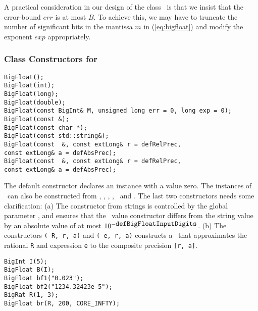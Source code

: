 A practical consideration in our design of the class \BF\ is
that we insist that the error-bound $err$
is at most $B$.  To achieve this, we may
have to truncate the number of significant
bits in the mantissa $m$ in (\ref{eq:bigfloat}) and modify the exponent $exp$
appropriately.

\subsubsection{Class Constructors for \BF}
\label{sec-bf-cons}
\begin{progb}{
\> \tt 	 BigFloat();\\
\> \tt 	 BigFloat(int);\\
\> \tt 	 BigFloat(long);\\
\> \tt 	 BigFloat(double);\\
\> \tt 	 BigFloat(const BigInt\& M, unsigned long err = 0, long exp = 0);\\
\> \tt   BigFloat(const \BF \&);\\
\> \tt 	 BigFloat(const char *);\\
\> \tt 	 BigFloat(const std::string\&);\\
\> \tt 	 BigFloat(const \Rat\ \&,  const extLong\& r = defRelPrec,\\
\> \> \> \tt            const extLong\& a = defAbsPrec);\\
\> \tt 	 BigFloat(const \expr\ \&, const extLong\& r = defRelPrec,\\
\> \> \> \tt            const extLong\& a = defAbsPrec);
}\end{progb}

The default constructor declares an instance with a value
zero. The instances of \BF\ can also be constructed from \int,
\lng, \float, \double, \Int\ and \str.  
The last two constructors needs some clarification:
(a)
The constructor from strings is controlled by the global parameter ,
and ensures that the \BF\ value constructor differs from the
string value by an absolute value of at most $10^{-\mbox{\tt defBigFloatInputDigits}}$.
(b)
The constructors {\tt \BF(\Rat\ R, r, a)} 
and {\tt \BF(\expr\ e, r, a)} constructs a
\BF\ that approximates the rational {\tt R} and expression {\tt e}
to the composite precision {\tt [r, a]}. 

\nopagebreak
\begin{progb}{
\> \tt BigInt I(5); \\
\> \tt BigFloat B(I); \\
\> \tt BigFloat bf1("0.023");\\
\> \tt BigFloat bf2("1234.32423e-5");\\
\> \tt BigRat R(1, 3);\\
\> \tt BigFloat br(R, 200, CORE\_INFTY);
}\end{progb}

